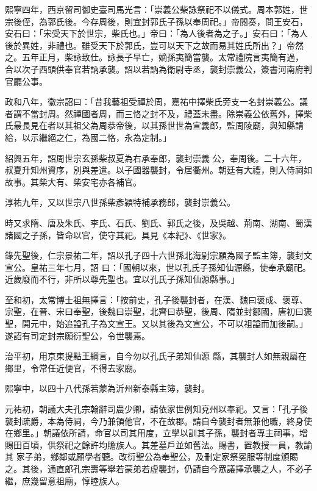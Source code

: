 \begin{pinyinscope}
 熙寧四年，西京留司御史臺司馬光言：「崇義公柴詠祭祀不以儀式。周本郭姓，世宗後侄，為郭氏後。今存周後，則宜封郭氏子孫以奉周祀。」帝閱奏，問王安石，安石曰：「宋受天下於世宗，柴氏也。」帝曰：「為人後者為之子。」安石曰：「為人後於異姓，非禮也。雖受天下於郭氏，豈可以天下之故而易其姓氏所出？」帝然之。五年正月，柴詠致仕。詠長子早亡，嫡孫夷簡當襲。太常禮院言夷簡有過，
 合以次子西頭供奉官若訥承襲。詔以若訥為衛尉寺丞，襲封崇義公，簽書河南府判官廳公事。



 政和八年，徽宗詔曰：「昔我藝祖受禪於周，嘉祐中擇柴氏旁支一名封崇義公。議者謂不當封周。然禪國者周，而三恪之封不及，禮蓋未盡。除崇義公依舊外，擇柴氏最長見在者以其祖父為周恭帝後，以其孫世世為宣義郎，監周陵廟，與知縣請給，以示繼絕之仁，為國二恪，永為定制。」



 紹興五年，詔周世宗玄孫柴叔夏為右承奉郎，襲封崇義
 公，奉周後。二十六年，叔夏升知州資序，別與差遣。以子國器襲封，令居衢州。朝廷有大禮，則入侍祠如故事。其柴大有、柴安宅亦各補官。



 淳祐九年，又以世宗八世孫柴彥穎特補承務郎，襲封崇義公。



 時又求隋、唐及朱氏、李氏、石氏、劉氏、郭氏之後，及吳越、荊南、湖南、蜀漢諸國之子孫，皆命以官，使守其祀。具見《本紀》、《世家》。



 錄先聖後，仁宗景祐二年，詔以孔子四十六世孫北海尉宗願為國子監主簿，襲封文宣公。皇祐三年七月，詔
 曰：「國朝以來，世以孔氏子孫知仙源縣，使奉承廟祀。近歲廢而不行，非所以尊先聖也。宜以孔氏子孫知仙源縣事。」



 至和初，太常博士祖無擇言：「按前史，孔子後襲封者，在漢、魏曰褒成、褒尊、宗聖，在晉、宋曰奉聖，後魏曰崇聖，北齊曰恭聖，後周、隋並封鄒國，唐初曰褒聖，開元中，始追謚孔子為文宣王。又以其後為文宣公，不可以祖謚而加後嗣。」遂詔有司定封宗願衍聖公，令世襲焉。



 治平初，用京東提點王綱言，自今勿以孔氏子弟知仙源
 縣，其襲封人如無親屬在鄉里，令常任近便官，不得去家廟。



 熙寧中，以四十八代孫若蒙為沂州新泰縣主簿，襲封。



 元祐初，朝議大夫孔宗翰辭司農少卿，請依家世例知兗州以奉祀。又言：「孔子後襲封疏爵，本為侍祠，今乃兼領他官，不在故郡。請自今襲封者無兼他職，終身使在鄉里。」朝議依所請，命官以司其用度，立學以訓其子孫，襲封者專主祠事，增賜田百頃，供祭祀之餘許均贍族人。其差墓戶並如舊法。賜書，置教授一員，教諭其
 家子弟，鄉鄰或願學者聽。改衍聖公為奉聖公，及刪定家祭冕服等制度頒賜之。其後，通直郎孔宗壽等舉若蒙弟若虛襲封，仍請自今眾議擇承襲之人，不必子繼，庶幾留意祖廟，惇睦族人。




\end{pinyinscope}
